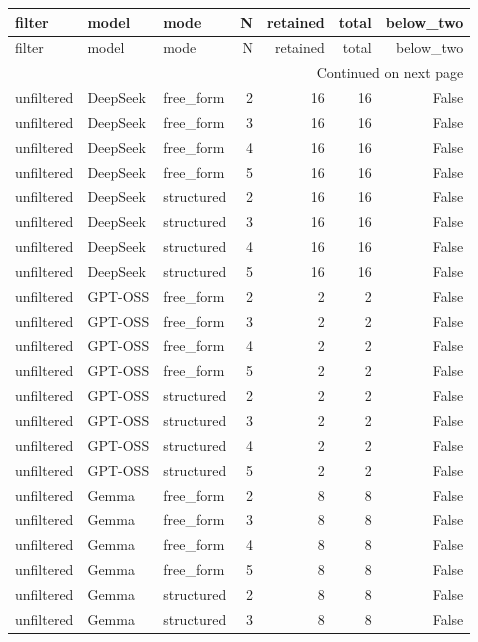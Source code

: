 \begin{longtable}{lllrrrr}
\toprule
filter & model & mode & N & retained & total & below\_two \\
\midrule
\endfirsthead
\toprule
filter & model & mode & N & retained & total & below\_two \\
\midrule
\endhead
\midrule
\multicolumn{7}{r}{Continued on next page} \\
\midrule
\endfoot
\bottomrule
\endlastfoot
unfiltered & DeepSeek & free\_form & 2 & 16 & 16 & False \\
unfiltered & DeepSeek & free\_form & 3 & 16 & 16 & False \\
unfiltered & DeepSeek & free\_form & 4 & 16 & 16 & False \\
unfiltered & DeepSeek & free\_form & 5 & 16 & 16 & False \\
unfiltered & DeepSeek & structured & 2 & 16 & 16 & False \\
unfiltered & DeepSeek & structured & 3 & 16 & 16 & False \\
unfiltered & DeepSeek & structured & 4 & 16 & 16 & False \\
unfiltered & DeepSeek & structured & 5 & 16 & 16 & False \\
unfiltered & GPT-OSS & free\_form & 2 & 2 & 2 & False \\
unfiltered & GPT-OSS & free\_form & 3 & 2 & 2 & False \\
unfiltered & GPT-OSS & free\_form & 4 & 2 & 2 & False \\
unfiltered & GPT-OSS & free\_form & 5 & 2 & 2 & False \\
unfiltered & GPT-OSS & structured & 2 & 2 & 2 & False \\
unfiltered & GPT-OSS & structured & 3 & 2 & 2 & False \\
unfiltered & GPT-OSS & structured & 4 & 2 & 2 & False \\
unfiltered & GPT-OSS & structured & 5 & 2 & 2 & False \\
unfiltered & Gemma & free\_form & 2 & 8 & 8 & False \\
unfiltered & Gemma & free\_form & 3 & 8 & 8 & False \\
unfiltered & Gemma & free\_form & 4 & 8 & 8 & False \\
unfiltered & Gemma & free\_form & 5 & 8 & 8 & False \\
unfiltered & Gemma & structured & 2 & 8 & 8 & False \\
unfiltered & Gemma & structured & 3 & 8 & 8 & False \\

\end{longtable}
